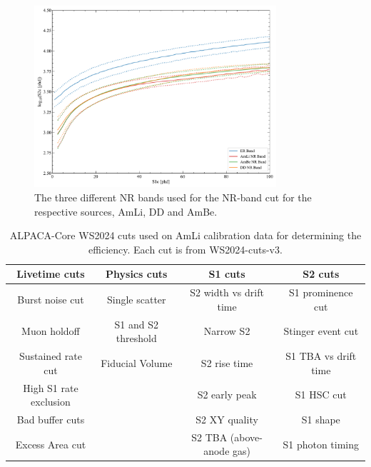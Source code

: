 \begin{figure}
	\centering
	\includegraphics[width=0.8\textwidth]{figures/VetoEfficiency/SR3NRBands.pdf}
	\caption{The three different NR bands used for the NR-band cut for the respective sources, AmLi, DD and AmBe.}
	\label{fig:VetoEff/SR3NRBands}
\end{figure}
\begin{table}
	\centering
	\begin{tabular}{|c|c|c|c|}
    \hline
		Livetime cuts          & Physics cuts        & S1 cuts                  & S2 cuts              \\
		\hline
		Burst noise cut        & Single scatter      & S2 width vs drift time   & S1 prominence cut    \\
		Muon holdoff           & S1 and S2 threshold & Narrow S2                & Stinger event cut    \\
		Sustained rate cut     & Fiducial Volume     & S2 rise time             & S1 TBA vs drift time \\
		High S1 rate exclusion &                     & S2 early peak            & S1 HSC cut           \\
		Bad buffer cuts        &                     & S2 XY quality            & S1 shape             \\
		Excess Area cut        &                     & S2 TBA (above-anode gas) & S1 photon timing     \\
        \hline
	\end{tabular}
	\caption{ALPACA-Core WS2024 cuts used on AmLi calibration data for determining the efficiency.
		Each cut is from WS2024-cuts-v3.
	}
	\label{tab:amli_efficiency_cuts}
\end{table}

